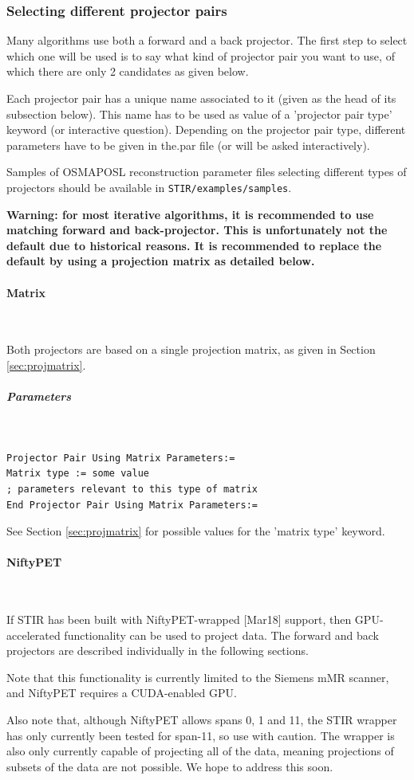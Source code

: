 \documentclass{article}
\newcommand{\subsubsubsection}[1]{\paragraph{#1}\mbox{} \\}
\newcommand{\subsubsubsubsection}[1]{\subparagraph{#1} \mbox{} \\}
\begin{document}
{{\subsubsection{
Selecting different projector pairs}
\label{sec:projectorpairs}
Many algorithms use both a forward and a back projector. The 
first step to select which one will be used is to say what kind 
of projector pair you want to use, of which there are only 2 
candidates as given below. 


Each projector pair has a unique name associated to it (given 
as the head of its subsection below). This name has to be used 
as value of a 'projector pair type' keyword (or interactive question). 
Depending on the projector pair type, different parameters have 
to be given in the.par file (or will be asked interactively).


Samples of OSMAPOSL reconstruction parameter files selecting 
different types of projectors should be available in \texttt{STIR/examples/samples}.

\textbf{Warning: for most iterative algorithms, it is recommended 
to use matching forward and back-projector. This is unfortunately 
not the default due to historical reasons. It is recommended to replace
the default by using a projection matrix as detailed below.}

{ \subsubsubsection{Matrix}
}
\label{sec:projectorpairusingmatrix}
Both projectors are based on a single projection matrix, as given 
in Section \ref{sec:projmatrix}.

{ \subsubsubsubsection{Parameters}
}
\begin{verbatim}
Projector Pair Using Matrix Parameters:=
Matrix type := some value
; parameters relevant to this type of matrix
End Projector Pair Using Matrix Parameters:=
\end{verbatim}

See Section \ref{sec:projmatrix} for possible values for the 'matrix type' keyword.

{ \subsubsubsection{NiftyPET}
}
\label{sec:projectorpairusingNiftyPET}
If STIR has been built with NiftyPET-wrapped [Mar18] support, then GPU-accelerated functionality can be used to project data. The forward and back projectors are described individually in the following sections.

Note that this functionality is currently limited to the Siemens mMR scanner, and NiftyPET requires a CUDA-enabled GPU.

Also note that, although NiftyPET allows spans 0, 1 and 11, the STIR wrapper has only currently been tested for span-11, so use with caution. The wrapper is also only currently capable of projecting all of the data, meaning projections of subsets of the data are not possible. We hope to address this soon.

}}
\end{document}
